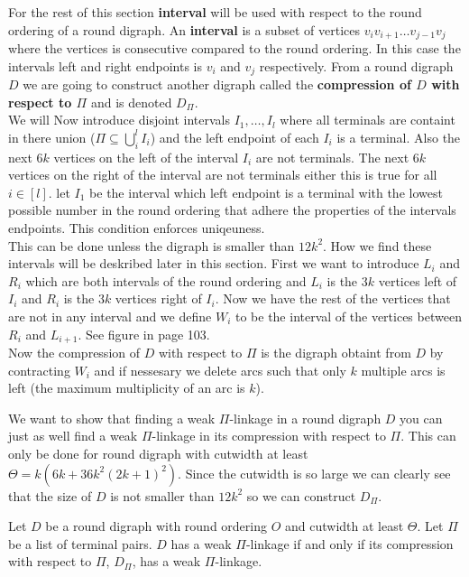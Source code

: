 For the rest of this section  \textbf{interval} will be used with respect to the round ordering of a round digraph. An \textbf{interval} is a subset of vertices $v_iv_{i+1}\dots v_{j-1}v_j$ where the vertices is consecutive compared to the round ordering. In this case the intervals left and right endpoints is $v_i$ and $v_j$ respectively.
From a round digraph $D$ we are going to construct another digraph called the \textbf{compression of $D$ with respect to $\Pi$} and is denoted $D_{\Pi}$. \\
We will Now introduce disjoint intervals $I_1,\dots ,I_l$ where all terminals are containt in there union ($\Pi \subseteq \bigcup_i ^l I_i$) and the left endpoint of each $I_i$ is a terminal.
Also the next $6k$ vertices on the left of the interval $I_i$ are not terminals.
The next $6k$ vertices on the right of the interval are not terminals either this is true for all $i\in [l]$. 
let $I_1$ be the interval which left endpoint is a terminal with the lowest possible number in the round ordering that adhere the properties of the intervals endpoints.
This condition enforces uniqeuness.\\
This can be done unless the digraph is smaller than $12k^2$.
How we find these intervals will be deskribed later in this section.
First we want to introduce $L_i$ and $R_i$ which are both intervals of the round ordering and $L_i$ is the $3k$ vertices left of $I_i$ and $R_i$ is the $3k$ vertices right of $I_i$.
Now we have the rest of the vertices that are not in any interval and we define $W_i$ to be the interval of the vertices between $R_i$ and $L_{i+1}$.
See figure in \cite{bangJGT77} page 103.\\
Now the compression of $D$ with respect to $\Pi$ is the digraph obtaint from $D$ by contracting $W_i$ and if nessesary we delete arcs such that only $k$ multiple arcs is left (the maximum multiplicity of an arc is $k$).

We want to show that finding a weak $\Pi$-linkage in a round digraph $D$ you can just as well find a weak $\Pi$-linkage in its compression with respect to $\Pi$. 
This can only be done for round digraph with cutwidth at least $\Theta =k(6k+36k^2(2k+1)^2)$.
Since the cutwidth is so large we can clearly see that the size of $D$ is not smaller than $12k^2$ so we can construct $D_{\Pi}$.

\begin{lemma}
    Let $D$ be a round digraph with round ordering $O$ and cutwidth at least $\Theta$. 
    Let $\Pi$ be a list of terminal pairs. 
    $D$ has a weak $\Pi$-linkage if and only if its compression with respect to $\Pi$, $D_{\Pi}$, has a weak $\Pi$-linkage.
    \label{lemma:iwanttoprove}
\end{lemma} 

